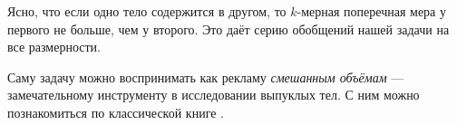 \begin{addedbytheeditors}
Ясно, что если одно тело содержится в другом, то $k$-мерная поперечная мера у первого не больше, чем у второго.
Это даёт серию обобщений нашей задачи на все размерности.

Саму задачу можно воспринимать как рекламу \emph{смешанным объёмам} --- замечательному инструменту в исследовании выпуклых тел.
С ним можно познакомиться по классической книге \cite{burago-zalgaller}.\pr
\end{addedbytheeditors}



